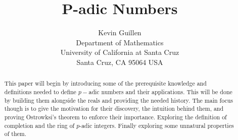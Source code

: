 \documentclass[12pt]{article}
\theoremstyle{definition}
\theoremstyle{remark}
\begin{document}
\title{P-adic Numbers}

\author{Kevin Guillen \\ 
Department of Mathematics \\
University of California at Santa Cruz \\
Santa Cruz, CA 95064 USA}

\maketitle

\begin{abstract}
This paper will begin by introducing some of the prerequisite knowledge and definitions needed to define $p-$adic numbers and their applications. This will be done by building them alongside the reals and providing the needed history. The main focus though is to give the motivation for their discovery, the intuition behind them, and proving Ostrowksi's theorem to enforce their importance. Exploring the definition of completion and the ring of $p$-adic integers. Finally exploring some unnatural properties of them. 
\end{abstract}
\end{document}
